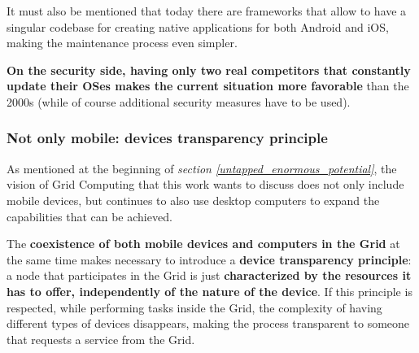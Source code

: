 It must also be mentioned that today there are frameworks that allow to have a singular codebase for creating native applications for both Android and iOS, making the maintenance process even simpler.

\textbf{On the security side, having only two real competitors that constantly update their OSes makes the current situation more favorable} than the 2000s (while of course additional security measures have to be used).

\subsubsection{Not only mobile: devices transparency principle}
As mentioned at the beginning of \textit{section \ref{untapped_enormous_potential}}, the vision of Grid Computing that this work wants to discuss does not only include mobile devices, but continues to also use desktop computers to expand the capabilities that can be achieved.

The \textbf{coexistence of both mobile devices and computers in the Grid} at the same time makes necessary to introduce a \textbf{device transparency principle}: a node that participates in the Grid is just \textbf{characterized by the resources it has to offer, independently of the nature of the device}. If this principle is respected, while performing tasks inside the Grid, the complexity of having different types of devices disappears, making the process transparent to someone that requests a service from the Grid.
